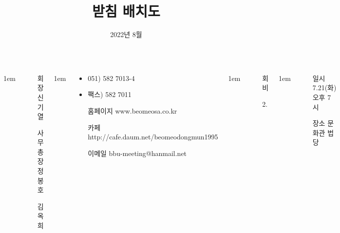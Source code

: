 \documentclass[	20pt, 
							a1paper, 
							portrait, %
							margin=0mm, %
							innermargin=10mm,  		%
							colspace=5mm, 
							subcolspace=0mm
							]{tikzposter}
\title{받침 배치도}
\author{ 2022년 8월 }
\begin{document}
	\maketitle

	\begin{columns}


			{
					\setlength{\leftmargini}{7em}
					\setlength{\labelsep} {1em}
				\begin{LARGE}
					\begin{itemize}
					\item [회장] 신기열
					\item [사무총장]정봉호
					\item [] 김옥희
					\end{itemize}
				\end{LARGE}
			}

			{
					\setlength{\leftmargini}{7em}
					\setlength{\labelsep} {1em}
				\begin{LARGE}
					\begin{itemize}
					\item 051) 582 7013-4
					\item 팩스) 582 7011
					\item [홈페이지] www.beomeosa.co.kr
					\item [카페] 	http://cafe.daum.net/beomeodongmun1995
					\item [이메일] 	bbu-meeting@hanmail.net

					\end{itemize}
				\end{LARGE}
			}


			{
					\setlength{\leftmargini}{4em}
					\setlength{\labelsep} {1em}
				\begin{LARGE}
					\begin{itemize}
					\item [회비]
					\item [2.] 
					\end{itemize}
				\end{LARGE}
			}



			{
					\setlength{\leftmargini}{4em}
					\setlength{\labelsep} {1em}
				\begin{LARGE}
					\begin{itemize}
					\item [일시] 7.21(화) 오후 7시
					\item [장소] 문화관 법당
					\end{itemize}
				\end{LARGE}
			}






\end{columns}
\end{document}
